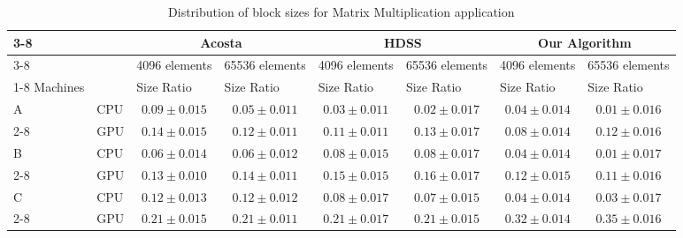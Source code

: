 \documentclass[journal]{IEEEtran}
\begin{document}
\begin{table}[htb]
\centering
\caption{Distribution of block sizes for Matrix Multiplication application}
\begin{scriptsize}
\begin{tabular}{|l|l|l|l|l|l|l|l|}
\cline{3-8}
\multicolumn{1}{l}{} &  & \multicolumn{2}{c|}{Acosta} & \multicolumn{2}{c|}{HDSS} & \multicolumn{2}{c|}{Our Algorithm} \\ 
\cline{3-8}
\multicolumn{1}{l}{} &  & \multicolumn{1}{c|}{4096 elements} & \multicolumn{1}{c|}{65536 elements} & \multicolumn{1}{c|}{4096 elements} & \multicolumn{1}{c|}{65536 elements} & \multicolumn{1}{c|}{4096 elements} & \multicolumn{1}{|c|}{65536 elements} \\ 
\cline{1-8}
\multicolumn{1}{|c}{} Machines &  & Size Ratio & Size Ratio & Size Ratio & Size Ratio & Size Ratio  & Size Ratio\\ 
\hline
A & CPU & \multicolumn{1}{c|}{$0.09 \pm 0.015$} & \multicolumn{1}{c|}{$0.05\pm 0.011$}  & \multicolumn{1}{c|}{$0.03 \pm 0.011$}  & \multicolumn{1}{c|}{$0.02 \pm 0.017$} & \multicolumn{1}{c|}{$0.04\pm 0.014$} & \multicolumn{1}{c|}{$0.01\pm 0.016$} \\ 
\cline{2-8}
 & GPU & \multicolumn{1}{c|}{$0.14 \pm 0.015$} & \multicolumn{1}{c|}{$0.12 \pm 0.011$} & \multicolumn{1}{c|}{$0.11 \pm 0.011$} & \multicolumn{1}{c|}{$0.13 \pm 0.017$} & \multicolumn{1}{c|}{$0.08 \pm 0.014$} & \multicolumn{1}{c|}{$0.12 \pm 0.016$} \\ 
\hline
B & CPU & \multicolumn{1}{c|}{$0.06 \pm 0.014$} & \multicolumn{1}{c|}{$0.06 \pm 0.012$} & \multicolumn{1}{c|}{$0.08 \pm 0.015$} & \multicolumn{1}{c|}{$0.08 \pm 0.017$} & \multicolumn{1}{c|}{$0.04 \pm 0.014$} & \multicolumn{1}{c|}{$0.01 \pm 0.017$} \\ 
\cline{2-8}
 & GPU & \multicolumn{1}{c|}{$0.13\pm 0.010$} & \multicolumn{1}{c|}{$0.14 \pm 0.011$} & \multicolumn{1}{c|}{$0.15\pm 0.015$} & \multicolumn{1}{c|}{$0.16 \pm 0.017$} & \multicolumn{1}{c|}{$0.12 \pm 0.015$} & \multicolumn{1}{c|}{$0.11 \pm 0.016$} \\ 
\hline
C & CPU & \multicolumn{1}{c|}{$0.12 \pm 0.013$} & \multicolumn{1}{c|}{$0.12 \pm 0.012$} & \multicolumn{1}{c|}{$0.08 \pm 0.017$} & \multicolumn{1}{c|}{$0.07 \pm 0.015$} & \multicolumn{1}{c|}{$0.04 \pm 0.014$} & \multicolumn{1}{c|}{$0.03 \pm 0.017$} \\ 
\cline{2-8}
 & GPU & \multicolumn{1}{c|}{$0.21 \pm 0.015$} & \multicolumn{1}{c|}{$0.21 \pm 0.011$} & \multicolumn{1}{c|}{$0.21 \pm 0.017$} & \multicolumn{1}{c|}{$0.21 \pm 0.015$} & \multicolumn{1}{c|}{$0.32 \pm 0.014$} & \multicolumn{1}{c|}{$0.35 \pm 0.016$} \\ 

\end{tabular}
\end{scriptsize}
\end{table}
\end{document}

